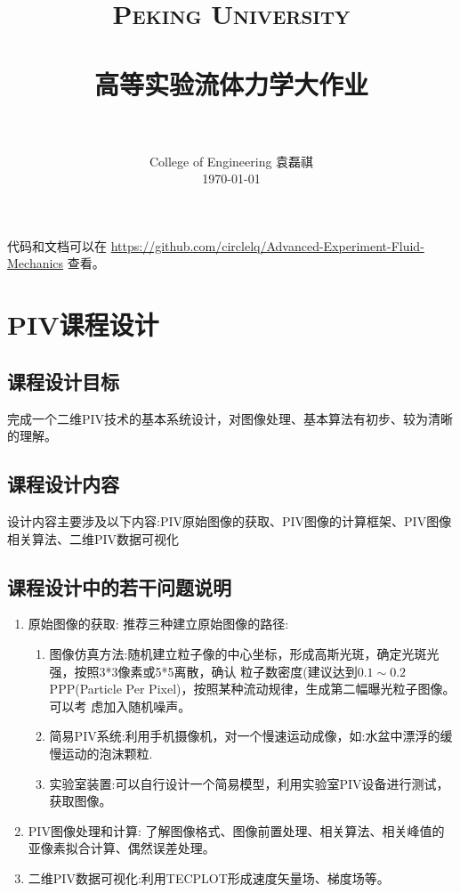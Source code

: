 \documentclass[12pt]{article}
\title{
		\vspace{-1in} 	
		\usefont{OT1}{bch}{b}{n}
		\normalfont \normalsize \textsc{\LARGE Peking University}\\[0.2cm] %
		\horrule{0.5pt} \\[0.2cm]
		\huge \bfseries{高等实验流体力学大作业} \\[-0.2cm]
		\horrule{2pt} \\[0.2cm]
}
\author{
		\normalfont 								\normalsize
		College of Engineering \quad 2001111690  \quad 袁磊祺\\	\normalsize
        \today
}
\date{}
\begin{document}


\maketitle

代码和文档可以在 \href{https://github.com/circlelq/Advanced-Experiment-Fluid-Mechanics}{https://github.com/circlelq/Advanced-Experiment-Fluid-Mechanics} 查看。

\section{PIV课程设计}

\subsection{课程设计目标}

完成一个二维PIV技术的基本系统设计，对图像处理、基本算法有初步、较为清晰的理解。

\subsection{课程设计内容}

设计内容主要涉及以下内容:PIV原始图像的获取、PIV图像的计算框架、PIV图像相关算法、二维PIV数据可视化



\subsection{课程设计中的若干问题说明}


\begin{enumerate}
	\item 原始图像的获取: 推荐三种建立原始图像的路径:
	      \begin{enumerate}
		      \item 图像仿真方法:随机建立粒子像的中心坐标，形成高斯光斑，确定光斑光强，按照3*3像素或5*5离散，确认 粒子数密度(建议达到$0.1 \sim 0.2$PPP(Particle Per Pixel)，按照某种流动规律，生成第二幅曝光粒子图像。可以考 虑加入随机噪声。
		      \item 简易PIV系统:利用手机摄像机，对一个慢速运动成像，如:水盆中漂浮的缓慢运动的泡沫颗粒.
		      \item 实验室装置:可以自行设计一个简易模型，利用实验室PIV设备进行测试，获取图像。
	      \end{enumerate}
	\item PIV图像处理和计算: 了解图像格式、图像前置处理、相关算法、相关峰值的亚像素拟合计算、偶然误差处理。
	\item 二维PIV数据可视化:利用TECPLOT形成速度矢量场、梯度场等。
\end{enumerate}
\end{document}
